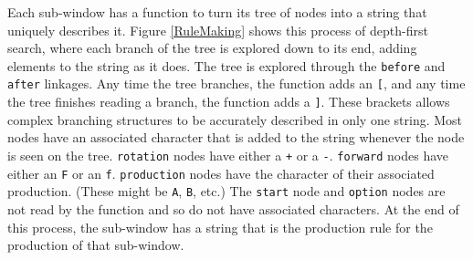 \documentclass[12pt,twoside]{reedthesis}
\newcommand{\code}[1]{\texttt{#1}}
\begin{document}
	 Each sub-window has a function to turn its tree of nodes into a string that uniquely describes it. Figure \ref{RuleMaking} shows this process of depth-first search, where each branch of the tree is explored down to its end, adding elements to the string as it does. The tree is explored through the \code{before} and \code{after} linkages. Any time the tree branches, the function adds an \code{[}, and any time the tree finishes reading a branch, the function adds a \code{]}. These brackets allows complex branching structures to be accurately described in only one string. Most nodes have an associated character that is added to the string whenever the node is seen on the tree. \code{rotation} nodes have either a \code{+} or a \code{-}. \code{forward} nodes have either an \code{F} or an \code{f}. \code{production} nodes have the character of their associated production. (These might be \code{A}, \code{B}, etc.) The \code{start} node and \code{option} nodes are not read by the function and so do not have associated characters. At the end of this process, the sub-window has a string that is the production rule for the production of that sub-window.\\
	 
\end{document}
